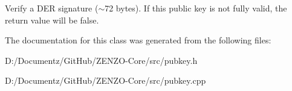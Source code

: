 Verify a D\+ER signature ($\sim$72 bytes). If this public key is not fully valid, the return value will be false. 

The documentation for this class was generated from the following files\+:\begin{DoxyCompactItemize}
\item 
D\+:/\+Documentz/\+Git\+Hub/\+Z\+E\+N\+Z\+O-\/\+Core/src/pubkey.\+h\item 
D\+:/\+Documentz/\+Git\+Hub/\+Z\+E\+N\+Z\+O-\/\+Core/src/pubkey.\+cpp\end{DoxyCompactItemize}
